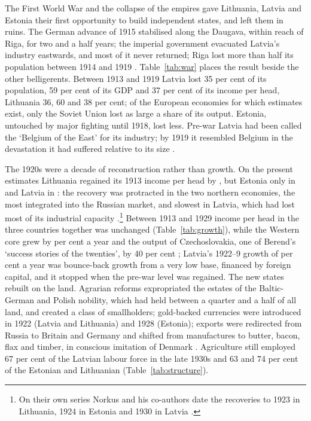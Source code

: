 The First World War and the collapse of the empires gave Lithuania, Latvia and Estonia their first opportunity to build independent states, and left them in ruins. The German advance of 1915 stabilised along the Daugava, within reach of Riga, for two and a half years; the imperial government evacuated Latvia's industry eastwards, and most of it never returned; Riga lost more than half its population between 1914 and 1919 \parencites[107]{ehbaltics_tarvel}[616]{norkusmark2021}[103]{karnups_2017_neatkarigas}. Table~\ref{tab:war} places the result beside the other belligerents. Between 1913 and 1919 Latvia lost 35 per cent of its population, 59 per cent of its GDP and 37 per cent of its income per head, Lithuania 36, 60 and 38 per cent; of the European economies for which estimates exist, only the Soviet Union lost as large a share of its output. Estonia, untouched by major fighting until 1918, lost less. Pre-war Latvia had been called the `Belgium of the East' for its industry; by 1919 it resembled Belgium in the devastation it had suffered relative to its size \parencite[77]{hiden_salmon}.



The 1920s were a decade of reconstruction rather than growth. On the present estimates Lithuania regained its 1913 income per head by \ltREGAINthirteen{}, but Estonia only in \eeREGAINthirteen{} and Latvia in \lvREGAINthirteen{}: the recovery was protracted in the two northern economies, the most integrated into the Russian market, and slowest in Latvia, which had lost most of its industrial capacity \parencites[95--6]{aldcroftthirdworld}[103]{eastern_crampton}.\footnote{On their own series Norkus and his co-authors date the recoveries to 1923 in Lithuania, 1924 in Estonia and 1930 in Latvia \parencite[6]{norkus_2025_denmarkisation}.} Between 1913 and 1929 income per head in the three countries together was unchanged (Table~\ref{tab:growth}), while the Western core grew by  per cent a year and the output of Czechoslovakia, one of Berend's `success stories of the twenties', by 40 per cent \parencite[243]{Berenddecadesofcrisis}; Latvia's 1922--9 growth of  per cent a year was bounce-back growth from a very low base, financed by foreign capital, and it stopped when the pre-war level was regained. The new states rebuilt on the land. Agrarian reforms expropriated the estates of the Baltic-German and Polish nobility, which had held between a quarter and a half of all land, and created a class of smallholders; gold-backed currencies were introduced in 1922 (Latvia and Lithuania) and 1928 (Estonia); exports were redirected from Russia to Britain and Germany and shifted from manufactures to butter, bacon, flax and timber, in conscious imitation of Denmark \parencites[113--15]{kasekamp2010}[1--2]{norkus_2025_denmarkisation}[121]{vaskela_1996_land}[74]{bernankegd01}[126, 131]{terleckaspinigai}. Agriculture still employed 67 per cent of the Latvian labour force in the late 1930s and 63 and 74 per cent of the Estonian and Lithuanian (Table~\ref{tab:structure}).

